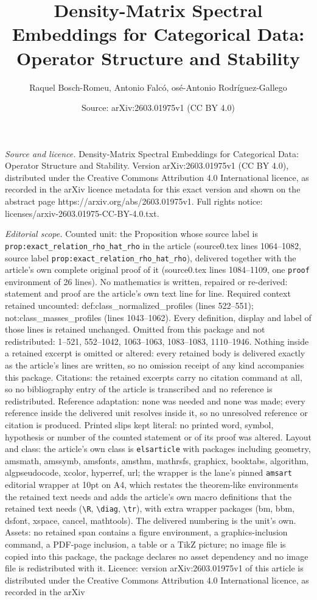 \documentclass[10pt,a4paper]{amsart}
\title[Density-Matrix Spectral Embeddings for Categorical Data: Ope]{Density-Matrix Spectral Embeddings for Categorical Data: Operator Structure and Stability}
\author{Raquel Bosch-Romeu, Antonio Falc\'o, os\'e-Antonio Rodr\'iguez-Gallego}
\date{Source: arXiv:2603.01975v1 (CC BY 4.0)}
\begin{document}
\maketitle

\noindent\emph{Source and licence.} Density-Matrix Spectral Embeddings for Categorical Data: Operator Structure and Stability. Version arXiv:2603.01975v1 (CC BY 4.0), distributed under the Creative Commons Attribution 4.0 International licence, as recorded in the arXiv licence metadata for this exact version and shown on the abstract page https://arxiv.org/abs/2603.01975v1. Full rights notice: licenses/arxiv-2603.01975-CC-BY-4.0.txt.\par\smallskip

\noindent\textit{Editorial scope.} Counted unit: the Proposition whose source label is \texttt{prop:exact\_relation\_rho\_hat\_rho} in the article (source0.tex lines 1064--1082, source label \texttt{prop:exact\_relation\_rho\_hat\_rho}), delivered together with the article's own complete original proof of it (source0.tex lines 1084--1109, one \texttt{proof} environment of 26 lines). No mathematics is written, repaired or re-derived: statement and proof are the article's own text line for line. Required context retained uncounted: def:class\_normalized\_profiles (lines 522--551); not:class\_masses\_profiles (lines 1043--1062). Every definition, display and label of those lines is retained unchanged. Omitted from this package and not redistributed: 1--521, 552--1042, 1063--1063, 1083--1083, 1110--1946. Nothing inside a retained excerpt is omitted or altered: every retained body is delivered exactly as the article's lines are written, so no omission receipt of any kind accompanies this package. Citations: the retained excerpts carry no citation command at all, so no bibliography entry of the article is transcribed and no reference is redistributed. Reference adaptation: none was needed and none was made; every reference inside the delivered unit resolves inside it, so no unresolved reference or citation is produced. Printed slips kept literal: no printed word, symbol, hypothesis or number of the counted statement or of its proof was altered. Layout and class: the article's own class is \texttt{elsarticle} with packages including geometry, amsmath, amssymb, amsfonts, amsthm, mathrsfs, graphicx, booktabs, algorithm, algpseudocode, xcolor, hyperref, url; the wrapper is the lane's pinned \texttt{amsart} editorial wrapper at 10pt on A4, which restates the theorem-like environments the retained text needs and adds the article's own macro definitions that the retained text needs (\texttt{\textbackslash R}, \texttt{\textbackslash diag}, \texttt{\textbackslash tr}), with extra wrapper packages (bm, bbm, dsfont, xspace, cancel, mathtools). The delivered numbering is the unit's own. Assets: no retained span contains a figure environment, a graphics-inclusion command, a PDF-page inclusion, a table or a TikZ picture; no image file is copied into this package, the package declares no asset dependency and no image file is redistributed with it. Licence: version arXiv:2603.01975v1 of this article is distributed under the Creative Commons Attribution 4.0 International licence, as recorded in the arXiv 
\end{document}
